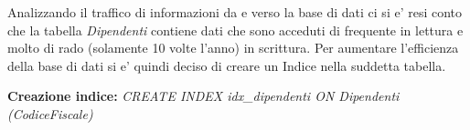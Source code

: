 Analizzando il traffico di informazioni da e verso la base di dati ci si e' resi conto che la tabella \emph{Dipendenti} contiene dati che sono acceduti di frequente in lettura e molto di rado (solamente 10 volte l'anno) in scrittura. Per aumentare l'efficienza della base di dati si e' quindi deciso di creare un Indice nella suddetta tabella.
\begin{flushleft}
	\textbf{{Creazione indice:}} \emph{CREATE INDEX idx\_dipendenti ON Dipendenti (CodiceFiscale)}
\end{flushleft}

